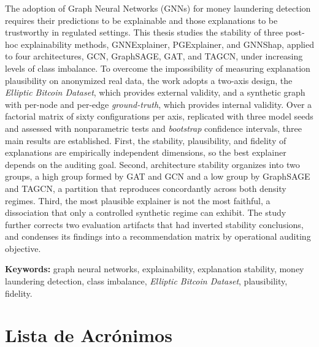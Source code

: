 \documentclass[a4paper,oneside,12pt]{book}
\begin{document}
The adoption of Graph Neural Networks (GNNs) for money laundering detection requires their predictions to be explainable and those explanations to be trustworthy in regulated settings. This thesis studies the stability of three post-hoc explainability methods, GNNExplainer, PGExplainer, and GNNShap, applied to four architectures, GCN, GraphSAGE, GAT, and TAGCN, under increasing levels of class imbalance. To overcome the impossibility of measuring explanation plausibility on anonymized real data, the work adopts a two-axis design, the \textit{Elliptic Bitcoin Dataset}, which provides external validity, and a synthetic graph with per-node and per-edge \textit{ground-truth}, which provides internal validity. Over a factorial matrix of sixty configurations per axis, replicated with three model seeds and assessed with nonparametric tests and \textit{bootstrap} confidence intervals, three main results are established. First, the stability, plausibility, and fidelity of explanations are empirically independent dimensions, so the best explainer depends on the auditing goal. Second, architecture stability organizes into two groups, a high group formed by GAT and GCN and a low group by GraphSAGE and TAGCN, a partition that reproduces concordantly across both density regimes. Third, the most plausible explainer is not the most faithful, a dissociation that only a controlled synthetic regime can exhibit. The study further corrects two evaluation artifacts that had inverted stability conclusions, and condenses its findings into a recommendation matrix by operational auditing objective.

\vspace{0.4cm}
\noindent\textbf{Keywords:} graph neural networks, explainability, explanation stability, money laundering detection, class imbalance, \textit{Elliptic Bitcoin Dataset}, plausibility, fidelity.

\clearpage

\tableofcontents

\newpage
\listoffigures
{}

\newpage
\listoftables
{}


\newpage
\chapter*{Lista de Acrónimos}
\end{document}

